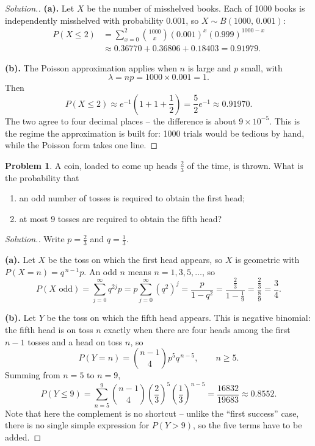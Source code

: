 \documentclass[12pt,a4paper]{report}
\theoremstyle{definition}
\theoremstyle{plain}
\theoremstyle{definition}
\newtheorem{problemx}{Problem}[section]
\newenvironment{problem}{\begin{problemx}}{\end{problemx}}
\newenvironment{solution}
  {\renewcommand{\qedsymbol}{}\begin{proof}[\textit{Solution}.]}
  {\end{proof}}
\begin{document}
\begin{solution}
\textbf{(a).} Let $X$ be the number of misshelved books. Each of 1000 books is
independently misshelved with probability $0.001$, so $X\sim B(1000,\,0.001)$:
\begin{align*}
P(X\leq 2) &= \sum_{x=0}^{2}\binom{1000}{x}(0.001)^{x}(0.999)^{1000-x}\\
 &\approx 0.36770+0.36806+0.18403 = 0.91979.
\end{align*}

\textbf{(b).} The Poisson approximation applies when $n$ is large and $p$ small, with
\[\lambda = np = 1000\times 0.001 = 1.\]
Then
\[P(X\leq 2) \approx e^{-1}\left(1+1+\frac{1}{2}\right) = \frac{5}{2}e^{-1}
 \approx 0.91970.\]
The two agree to four decimal places -- the difference is about $9\times 10^{-5}$. This
is the regime the approximation is built for: 1000 trials would be tedious by hand, while
the Poisson form takes one line.
\end{solution}

\begin{problem}
A coin, loaded to come up heads $\frac{2}{3}$ of the time, is thrown. What is the
probability that
\begin{enumerate}
\item[(a).] an odd number of tosses is required to obtain the first head;
\item[(b).] at most 9 tosses are required to obtain the fifth head?
\end{enumerate}
\end{problem}

\begin{solution}
Write $p = \tfrac23$ and $q = \tfrac13$.

\textbf{(a).} Let $X$ be the toss on which the first head appears, so $X$ is geometric
with $P(X=n) = q^{\,n-1}p$. An odd $n$ means $n = 1,3,5,\ldots$, so
\[P(X\text{ odd}) = \sum_{j=0}^{\infty}q^{2j}p = p\sum_{j=0}^{\infty}\left(q^{2}\right)^{j}
 = \frac{p}{1-q^{2}} = \frac{\frac23}{1-\frac19} = \frac{\frac23}{\frac89} = \frac{3}{4}.\]

\textbf{(b).} Let $Y$ be the toss on which the fifth head appears. This is negative
binomial: the fifth head is on toss $n$ exactly when there are four heads among the first
$n-1$ tosses and a head on toss $n$, so
\[P(Y=n) = \binom{n-1}{4}p^{5}q^{\,n-5}, \qquad n\geq 5.\]
Summing from $n=5$ to $n=9$,
\[P(Y\leq 9) = \sum_{n=5}^{9}\binom{n-1}{4}\left(\frac{2}{3}\right)^{5}
 \left(\frac{1}{3}\right)^{n-5} = \frac{16832}{19683} \approx 0.8552.\]
Note that here the complement is no shortcut -- unlike the ``first success'' case, there
is no single simple expression for $P(Y>9)$, so the five terms have to be added.
\end{solution}
\end{document}
